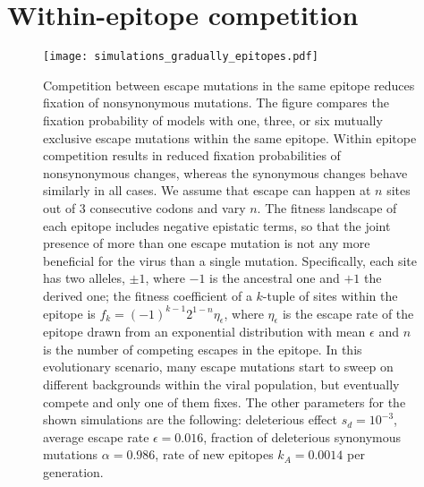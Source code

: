 \section{Within-epitope competition}
\begin{figure}[!ht]
\begin{center}
\texttt{[image: simulations\_gradually\_epitopes.pdf]}
\caption{
Competition between escape mutations in the same epitope reduces fixation of
nonsynonymous mutations. The figure compares the fixation probability of models
with one, three, or six mutually exclusive escape mutations within the
same epitope. Within epitope competition results in reduced fixation
probabilities of nonsynonymous changes, whereas the synonymous changes behave 
similarly in all cases. We assume that escape can happen at $n$ sites out of 3
consecutive codons and vary $n$.
The fitness landscape of each epitope includes negative epistatic terms, so that
the joint presence of more than one escape mutation is not any more beneficial
for the virus than a single mutation. Specifically, each site has two alleles,
$\pm 1$, where $-1$ is the ancestral one and $+1$ the derived one; the fitness
coefficient of a $k$-tuple of sites within the epitope is $f_k = (-1)^{k-1}
2^{1-n}\eta_\epsilon $, where $\eta_\epsilon$ is the escape rate of the epitope
drawn from an exponential distribution with mean $\epsilon$ and 
$n$ is the number of competing escapes in the epitope. 
In this evolutionary scenario, many escape mutations start to sweep on different backgrounds within the viral population, but eventually
compete and only one of them fixes. The other parameters for the shown simulations are
the following: deleterious effect $s_d = 10^{-3}$, average escape rate $\epsilon = 0.016$,
fraction of deleterious synonymous mutations $\alpha = 0.986$, rate of new epitopes
$k_A=0.0014$ per generation.
}
\label{fig:wec}
\end{center}
\end{figure}
